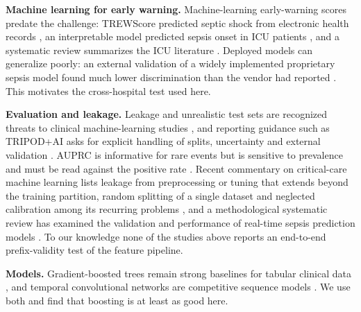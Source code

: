 \documentclass[preprint,12pt]{elsarticle}
\begin{document}
\textbf{Machine learning for early warning.} Machine-learning early-warning scores predate the challenge: TREWScore predicted septic shock from electronic health records \cite{henry2015}, an interpretable model predicted sepsis onset in ICU patients \cite{nemati2018}, and a systematic review summarizes the ICU literature \cite{moor2021}. Deployed models can generalize poorly: an external validation of a widely implemented proprietary sepsis model found much lower discrimination than the vendor had reported \cite{wong2021}. This motivates the cross-hospital test used here.

\textbf{Evaluation and leakage.} Leakage and unrealistic test sets are recognized threats to clinical machine-learning studies \cite{kaufman2012}, and reporting guidance such as TRIPOD+AI asks for explicit handling of splits, uncertainty and external validation \cite{collins2024}. AUPRC is informative for rare events but is sensitive to prevalence and must be read against the positive rate \cite{saito2015}. Recent commentary on critical-care machine learning lists leakage from preprocessing or tuning that extends beyond the training partition, random splitting of a single dataset and neglected calibration among its recurring problems \cite{cakiroglu2026}, and a methodological systematic review has examined the validation and performance of real-time sepsis prediction models \cite{wang2025}. To our knowledge none of the studies above reports an end-to-end prefix-validity test of the feature pipeline.

\textbf{Models.} Gradient-boosted trees remain strong baselines for tabular clinical data \cite{ke2017,chen2016}, and temporal convolutional networks are competitive sequence models \cite{bai2018}. We use both and find that boosting is at least as good here.
\end{document}
